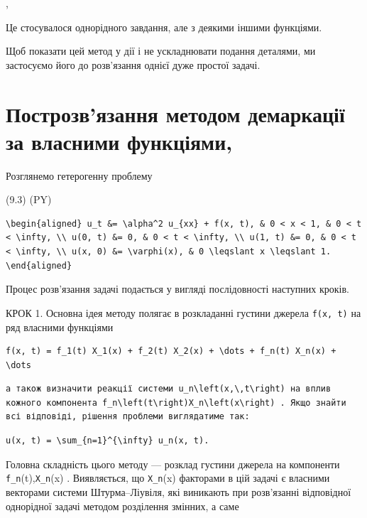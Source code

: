 \documentclass[
  ukrainian,
]{article}
\begin{document}
,

Це стосувалося однорідного завдання, але з деякими іншими функціями.

Щоб показати цей метод у дії і не ускладнювати подання деталями, ми
застосуємо його до розв'язання однієї дуже простої задачі.

\section{Построзв'язання методом демаркації за власними
функціями,}\label{ux43fux43eux441ux442ux440ux43eux437ux432ux44fux437ux430ux43dux43dux44f-ux43cux435ux442ux43eux434ux43eux43c-ux434ux435ux43cux430ux440ux43aux430ux446ux456ux457-ux437ux430-ux432ux43bux430ux441ux43dux438ux43cux438-ux444ux443ux43dux43aux446ux456ux44fux43cux438}

Розглянемо гетерогенну проблему

(9.3) (PY)

\begin{verbatim}
\begin{aligned} u_t &= \alpha^2 u_{xx} + f(x, t), & 0 < x < 1, & 0 < t < \infty, \\ u(0, t) &= 0, & 0 < t < \infty, \\ u(1, t) &= 0, & 0 < t < \infty, \\ u(x, 0) &= \varphi(x), & 0 \leqslant x \leqslant 1. \end{aligned}
\end{verbatim}

Процес розв'язання задачі подається у вигляді послідовності наступних
кроків.

КРОК 1. Основна ідея методу полягає в розкладанні густини джерела
\texttt{f(x,\ t)} на ряд власними функціями

\begin{verbatim}
f(x, t) = f_1(t) X_1(x) + f_2(t) X_2(x) + \dots + f_n(t) X_n(x) + \dots
\end{verbatim}

\begin{verbatim}
а також визначити реакції системи u_n\left(x,\,t\right) на вплив кожного компонента f_n\left(t\right)X_n\left(x\right) . Якщо знайти всі відповіді, рішення проблеми виглядатиме так:
\end{verbatim}

\begin{verbatim}
u(x, t) = \sum_{n=1}^{\infty} u_n(x, t).
\end{verbatim}

Головна складність цього методу --- розклад густини джерела на
компоненти \texttt{f\_n}(t),\texttt{X\_n}(x) . Виявляється, що
\texttt{X\_n}(x) факторами в цій задачі є власними векторами системи
Штурма--Ліувіля, які виникають при розв'язанні відповідної однорідної
задачі методом розділення змінних, а саме
\end{document}
